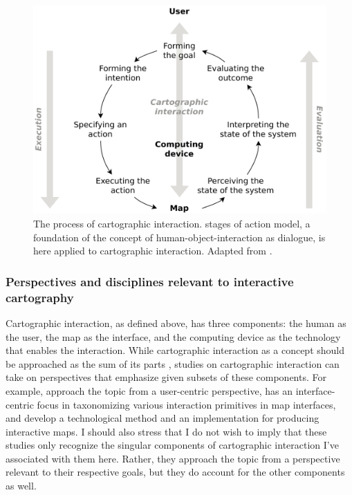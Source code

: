 \begin{figure}[H]
	\centering
	\includegraphics[width=\diagramwidth]{visual/figures/diagrams/map_interaction.png}
	\caption{
		The process of cartographic interaction.
		 stages of action model,
		a foundation of the concept of human-object-interaction as dialogue,
		is here applied to cartographic interaction.
		Adapted from \textcite{rot2012}.
	}
	\label{fig:map interaction}
\end{figure}


\subsubsection{Perspectives and disciplines relevant to interactive cartography}

Cartographic interaction, as defined above, has three components:
the human as the user, the map as the interface,
and the computing device as the technology that enables the interaction.
While cartographic interaction as a concept should be approached as
the sum of its parts \parencite{rot2013b},
studies on cartographic interaction can take on perspectives
that emphasize given subsets of these components.
For example, \textcite{col2009} approach the topic from a user-centric perspective,
\textcite{rot2013a} has an interface-centric focus in
taxonomizing various interaction primitives in map interfaces,
and \textcite{oym2021} develop a technological method and an implementation
for producing interactive maps.
I should also stress that I do not wish to imply that these studies
only recognize the singular components of cartographic interaction
I've associated with them here.
Rather, they approach the topic from a perspective relevant to their respective goals,
but they do account for the other components as well.

